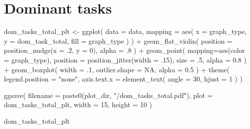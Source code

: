 \documentclass[
]{book}
\newenvironment{Shaded}{\begin{snugshade}}{\end{snugshade}}
\newcommand{\AttributeTok}[1]{\textcolor[rgb]{0.77,0.63,0.00}{#1}}
\newcommand{\ConstantTok}[1]{\textcolor[rgb]{0.00,0.00,0.00}{#1}}
\newcommand{\DecValTok}[1]{\textcolor[rgb]{0.00,0.00,0.81}{#1}}
\newcommand{\FloatTok}[1]{\textcolor[rgb]{0.00,0.00,0.81}{#1}}
\newcommand{\FunctionTok}[1]{\textcolor[rgb]{0.00,0.00,0.00}{#1}}
\newcommand{\NormalTok}[1]{#1}
\newcommand{\OtherTok}[1]{\textcolor[rgb]{0.56,0.35,0.01}{#1}}
\newcommand{\SpecialCharTok}[1]{\textcolor[rgb]{0.00,0.00,0.00}{#1}}
\newcommand{\StringTok}[1]{\textcolor[rgb]{0.31,0.60,0.02}{#1}}
\begin{document}
\hypertarget{dominant-tasks-1}{%
\section{Dominant tasks}\label{dominant-tasks-1}}

\begin{Shaded}
\begin{Highlighting}[]
\NormalTok{dom\_tasks\_total\_plt }\OtherTok{\textless{}{-}} \FunctionTok{ggplot}\NormalTok{(}
  \AttributeTok{data =}\NormalTok{ data,}
  \AttributeTok{mapping =} \FunctionTok{aes}\NormalTok{(}
    \AttributeTok{x =}\NormalTok{ graph\_type,}
    \AttributeTok{y =}\NormalTok{ dom\_task\_total,}
    \AttributeTok{fill =}\NormalTok{ graph\_type}
\NormalTok{  )}
\NormalTok{) }\SpecialCharTok{+}
  \FunctionTok{geom\_flat\_violin}\NormalTok{(}
    \AttributeTok{position =} \FunctionTok{position\_nudge}\NormalTok{(}\AttributeTok{x =}\NormalTok{ .}\DecValTok{2}\NormalTok{, }\AttributeTok{y =} \DecValTok{0}\NormalTok{),}
    \AttributeTok{alpha =}\NormalTok{ .}\DecValTok{8}
\NormalTok{  ) }\SpecialCharTok{+}
  \FunctionTok{geom\_point}\NormalTok{(}
    \AttributeTok{mapping=}\FunctionTok{aes}\NormalTok{(}\AttributeTok{color =}\NormalTok{ graph\_type),}
    \AttributeTok{position =} \FunctionTok{position\_jitter}\NormalTok{(}\AttributeTok{width =}\NormalTok{ .}\DecValTok{15}\NormalTok{),}
    \AttributeTok{size =}\NormalTok{ .}\DecValTok{5}\NormalTok{,}
    \AttributeTok{alpha =} \FloatTok{0.8}
\NormalTok{  ) }\SpecialCharTok{+}
  \FunctionTok{geom\_boxplot}\NormalTok{(}
    \AttributeTok{width =}\NormalTok{ .}\DecValTok{1}\NormalTok{,}
    \AttributeTok{outlier.shape =} \ConstantTok{NA}\NormalTok{,}
    \AttributeTok{alpha =} \FloatTok{0.5}
\NormalTok{  ) }\SpecialCharTok{+}
  \FunctionTok{theme}\NormalTok{(}
    \AttributeTok{legend.position =} \StringTok{"none"}\NormalTok{,}
    \AttributeTok{axis.text.x =} \FunctionTok{element\_text}\NormalTok{(}
      \AttributeTok{angle =} \DecValTok{30}\NormalTok{,}
      \AttributeTok{hjust =} \DecValTok{1}
\NormalTok{    )}
\NormalTok{  )}

\FunctionTok{ggsave}\NormalTok{(}
  \AttributeTok{filename =} \FunctionTok{paste0}\NormalTok{(plot\_dir, }\StringTok{"/dom\_tasks\_total.pdf"}\NormalTok{),}
  \AttributeTok{plot =}\NormalTok{ dom\_tasks\_total\_plt,}
  \AttributeTok{width =} \DecValTok{15}\NormalTok{,}
  \AttributeTok{height =} \DecValTok{10}
\NormalTok{)}

\NormalTok{dom\_tasks\_total\_plt}
\end{Highlighting}
\end{Shaded}
\end{document}

